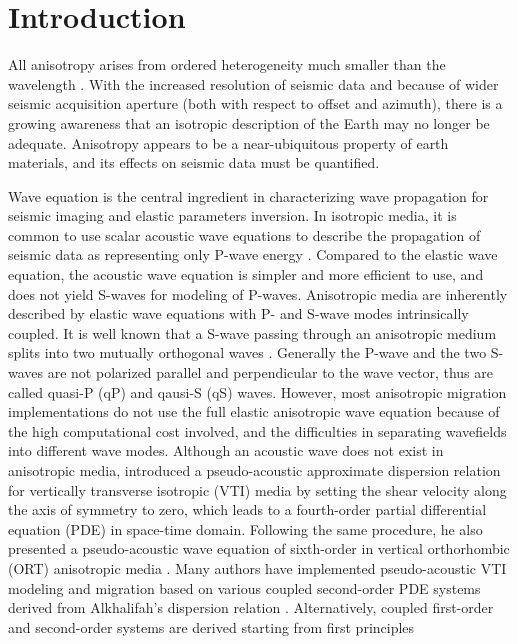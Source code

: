 \section{Introduction}
All anisotropy arises from ordered heterogeneity much smaller than the wavelength \cite[]{winterstein}.
 With the increased resolution of seismic data and because of wider seismic acquisition aperture
(both with respect to offset and azimuth), there is a growing awareness that an 
isotropic description of the Earth may no longer be adequate. Anisotropy appears to be a near-ubiquitous
 property of earth materials, and its effects on seismic data must be quantified.

 Wave equation is the central ingredient in characterizing wave propagation for seismic imaging and elastic
parameters inversion. In isotropic media, it is common to use scalar acoustic wave 
equations to describe the propagation of seismic data as representing only P-wave energy \cite[]{yilmaz}.
 Compared to the elastic wave equation, the acoustic wave equation is simpler and
 more efficient to use, and does not yield S-waves for modeling of P-waves.
 Anisotropic media are inherently described by elastic wave equations with P- and S-wave modes
 intrinsically coupled.
It is well known that a S-wave passing through an anisotropic medium splits into two mutually
 orthogonal waves \cite[]{crampin:1984}. Generally the P-wave and the two S-waves are not polarized parallel 
 and perpendicular to the wave vector, thus are called quasi-P (qP) and qausi-S (qS) waves.
 However, most anisotropic migration implementations
 do not use the full elastic anisotropic wave equation because of the high computational cost involved, and
 the difficulties in separating wavefields into different wave modes. Although an acoustic wave does not
 exist in anisotropic media, \cite{alkhalifah:2000} introduced a pseudo-acoustic
 approximate dispersion relation for vertically transverse isotropic (VTI) media by setting the shear 
velocity along the axis of symmetry to zero, which leads to a fourth-order partial differential equation (PDE)
 in space-time domain.
Following the same procedure, he also presented a pseudo-acoustic wave equation of sixth-order in
vertical orthorhombic (ORT) anisotropic media \cite[]{alkhalifah:2003}. Many authors have
 implemented pseudo-acoustic VTI modeling and migration based on
 various coupled second-order PDE systems derived
 from Alkhalifah's dispersion relation \cite[]{alkhalifah:2000,klie,zhou:2006eage,hestholm}.
Alternatively, coupled first-order and second-order systems are derived starting from first principles
